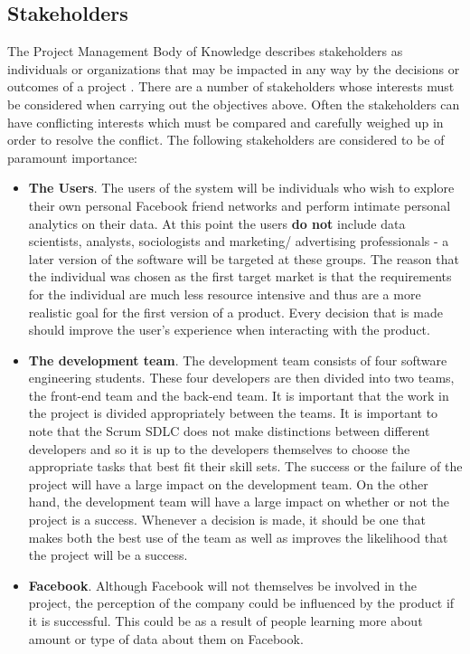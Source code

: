 \documentclass[12pt,onecolumn]{article}
\begin{document}
	\subsection{Stakeholders} %

		The Project Management Body of Knowledge describes stakeholders as individuals or organizations that may be impacted in any way by the decisions or outcomes of a project \cite{pmbok}. There are a number of stakeholders whose interests must be considered when carrying out the objectives above. Often the stakeholders can have conflicting interests which must be compared and carefully weighed up in order to resolve the conflict. The following stakeholders are considered to be of paramount importance:

		\begin{itemize}
			\item \textbf{The Users}. The users of the system will be individuals who wish to explore their own personal Facebook friend networks and perform intimate personal analytics on their data. At this point the users \textbf{do not} include data scientists, analysts, sociologists and marketing/ advertising professionals - a later version of the software will be targeted at these groups. The reason that the individual was chosen as the first target market is that the requirements for the individual are much less resource intensive and thus are a more realistic goal for the first version of a product. Every decision that is made should improve the user's experience when interacting with the product. 

			\item \textbf{The development team}. The development team consists of four software engineering students. These four developers are then divided into two teams, the front-end team and the back-end team. It is important that the work in the project is divided appropriately between the teams. It is important to note that the Scrum SDLC does not make distinctions between different developers and so it is up to the developers themselves to choose the appropriate tasks that best fit their skill sets. The success or the failure of the project will have a large impact on the development team. On the other hand, the development team will have a large impact on whether or not the project is a success. Whenever a decision is made, it should be one that makes both the best use of the team as well as improves the likelihood that the project will be a success.

			\item \textbf{Facebook}. Although Facebook will not themselves be involved in the project, the perception of the company could be influenced by the product if it is successful. This could be as a result of people learning more about amount or type of data about them on Facebook.

		\end{itemize}
\end{document}
